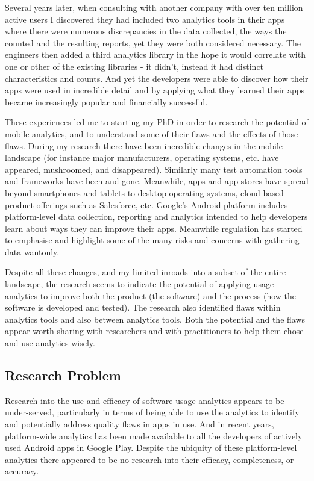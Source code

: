 Several years later, when consulting with another company with over ten million active users I discovered they had included two analytics tools in their apps where there were numerous discrepancies in the data collected, the ways the counted and the resulting reports, yet they were both considered necessary. The engineers then added a third analytics library in the hope it would correlate with one or other of the existing libraries - it didn't, instead it had distinct characteristics and counts. And yet the developers were able to discover how their apps were used in incredible detail and by applying what they learned their apps became increasingly popular and financially successful.

These experiences led me to starting my PhD in order to research the potential of mobile analytics, and to understand some of their flaws and the effects of those flaws. During my research there have been incredible changes in the mobile landscape (for instance major manufacturers, operating systems, etc. have appeared, mushroomed, and disappeared). Similarly many test automation tools and frameworks have been and gone. Meanwhile, apps and app stores have spread beyond smartphones and tablets to desktop operating systems, cloud-based product offerings such as Salesforce, etc. Google's Android platform includes platform-level data collection, reporting and analytics intended to help developers learn about ways they can improve their apps. Meanwhile regulation has started to emphasise and highlight some of the many risks and concerns with gathering data wantonly. 

Despite all these changes, and my limited inroads into a subset of the entire landscape, the research seems to indicate the potential of applying usage analytics to improve both the product (the software) and the process (how the software is developed and tested). The research also identified flaws within analytics tools and also between analytics tools. Both the potential and the flaws appear worth sharing with researchers and with practitioners to help them chose and use analytics wisely.


\subsection{Research Problem}
Research into the use and efficacy of software usage analytics appears to be under-served, particularly in terms of being able to use the analytics to identify and potentially address quality flaws in apps in use. And in recent years, platform-wide analytics has been made available to all the developers of actively used Android apps in Google Play. Despite the ubiquity of these platform-level analytics there appeared to be no research into their efficacy, completeness, or accuracy.


